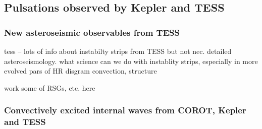 {\color{blue}
\subsection{Pulsations observed by Kepler and TESS}



\subsubsection{New asteroseismic observables from TESS}

tess -- lots of info about instabilty strips from TESS but not nec. detailed asteroseismology.  what science can we do with instablity strips, especially in more evolved pars of HR disgram  convection, structure

work some of RSGs, etc. here

\subsubsection{Convectively excited internal waves from COROT, Kepler and TESS}


}